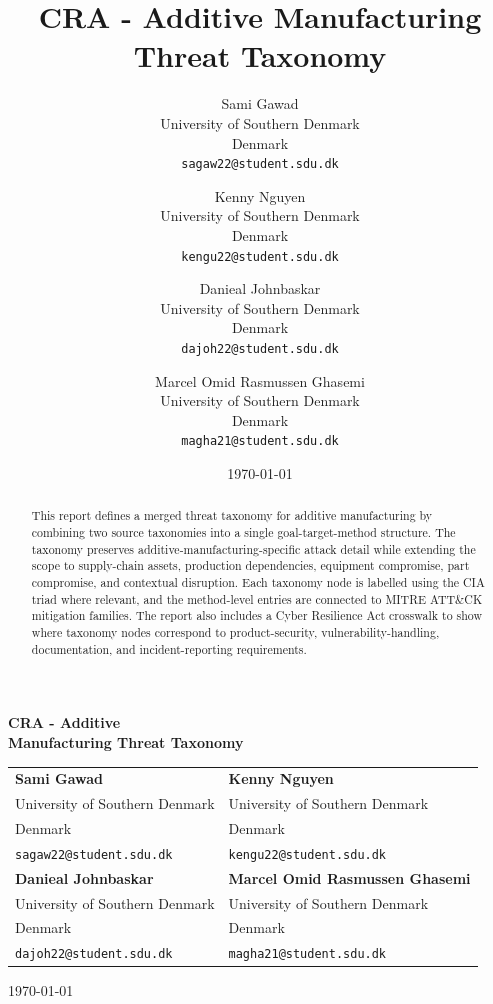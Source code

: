 \documentclass[10pt,a4paper,oneside]{report}
\title{CRA - Additive Manufacturing Threat Taxonomy}
\author{%
Sami Gawad\\
University of Southern Denmark\\
Denmark\\
\texttt{sagaw22@student.sdu.dk}
\and
Kenny Nguyen\\
University of Southern Denmark\\
Denmark\\
\texttt{kengu22@student.sdu.dk}
\and
Danieal Johnbaskar\\
University of Southern Denmark\\
Denmark\\
\texttt{dajoh22@student.sdu.dk}
\and
Marcel Omid Rasmussen Ghasemi\\
University of Southern Denmark\\
Denmark\\
\texttt{magha21@student.sdu.dk}
}
\date{\today}
\begin{document}

\begin{titlepage}
\thispagestyle{empty}
\begin{center}
\vspace*{1.5cm}
\vspace{1.2cm}
{\Huge\bfseries\color{ReportBlue} CRA - Additive\\[0.25em]Manufacturing Threat Taxonomy\par}
\vspace{1.2cm}
\vfill
\begin{tabularx}{0.92\linewidth}{@{}>{\centering\arraybackslash}X>{\centering\arraybackslash}X@{}}
\textbf{Sami Gawad} & \textbf{Kenny Nguyen}\\
University of Southern Denmark & University of Southern Denmark\\
Denmark & Denmark\\
\texttt{sagaw22@student.sdu.dk} & \texttt{kengu22@student.sdu.dk}\\[1.4cm]
\textbf{Danieal Johnbaskar} & \textbf{Marcel Omid Rasmussen Ghasemi}\\
University of Southern Denmark & University of Southern Denmark\\
Denmark & Denmark\\
\texttt{dajoh22@student.sdu.dk} & \texttt{magha21@student.sdu.dk}
\end{tabularx}
\vfill
{\large \today\par}
\vspace*{1.2cm}
\end{center}
\end{titlepage}

\begin{abstract}
This report defines a merged threat taxonomy for additive manufacturing by combining two source taxonomies into a single goal-target-method structure. The taxonomy preserves additive-manufacturing-specific attack detail while extending the scope to supply-chain assets, production dependencies, equipment compromise, part compromise, and contextual disruption. Each taxonomy node is labelled using the CIA triad where relevant, and the method-level entries are connected to MITRE ATT\&CK mitigation families. The report also includes a Cyber Resilience Act crosswalk to show where taxonomy nodes correspond to product-security, vulnerability-handling, documentation, and incident-reporting requirements.
\end{abstract}

\tableofcontents
\clearpage
{}
\end{document}
